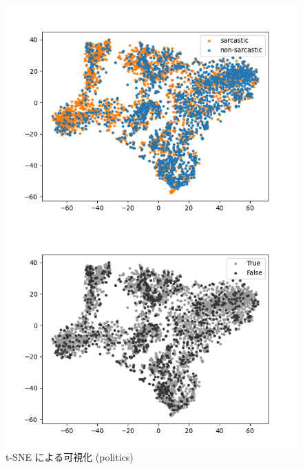 \begin{figure}[b]
\begin{center}
 	\begin{minipage}{0.4\hsize}
	\begin{center}
\includegraphics[width=\linewidth]{./figure/tsne_sarc_pol.png}
	\end{center}
	\end{minipage}
 	\begin{minipage}{0.4\hsize}
	\begin{center}
\includegraphics[width=\linewidth]{./figure/tsne_TorF_pol.png}
 	 \end{center}
 	\end{minipage}
	\caption{t-SNE による可視化 (politics)}
	\label{fig:40_tsne1}
\end{center}
\end{figure}

